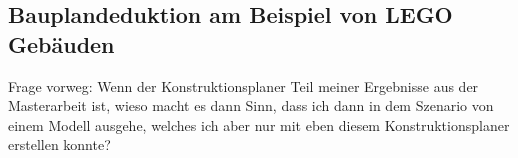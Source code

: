 \subsection{Bauplandeduktion am Beispiel von LEGO Gebäuden}
Frage vorweg: Wenn der Konstruktionsplaner Teil meiner Ergebnisse aus der Masterarbeit ist, wieso macht es dann Sinn, dass ich dann in dem Szenario von einem Modell ausgehe, welches ich aber nur mit eben diesem Konstruktionsplaner erstellen konnte?

